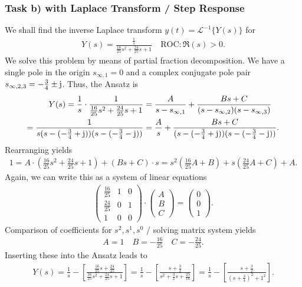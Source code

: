 \documentclass[11pt,a4paper,DIV=12]{scrartcl}
\begin{document}
\subsubsection{Task b) with Laplace Transform / Step Response}
We shall find the inverse Laplace transform $y(t) = \mathcal{L}^{-1}\{Y(s)\}$
for
\begin{align}
Y(s) = \frac{\frac{1}{s}}{\frac{16}{25} s^2 + \frac{24}{25} s + 1}
\quad \text{ROC}: \Re(s) > 0.
\end{align}
%
We solve this problem by means of partial fraction decomposition.
We have a single pole in the origin $s_{\infty,1}=0$ and a complex conjugate
pole pair $s_{\infty,2,3}=-\frac{3}{4}\pm \im$.
Thus, the Ansatz is
\begin{align}
Y(s) = \frac{1}{s}
\cdot \frac{1}{\frac{16}{25} s^2 + \frac{24}{25} s + 1} &=
\frac{A}{s-s_{\infty,1}} + \frac{Bs+C}{(s-s_{\infty,2})(s-s_{\infty,3})} \\ \nonumber
=\frac{1}{s(s-(-\frac{3}{4}+\im))(s-(-\frac{3}{4}-\im))}&=\frac{A}{s}+\frac{Bs+C}{(s-(-\frac{3}{4}+\im))(s-(-\frac{3}{4}-\im))}
.
\end{align}
Rearranging yields
\begin{align}
1 =
A \cdot (\frac{16}{25} s^2 + \frac{24}{25} s + 1) +
(B s + C) \cdot s=s^2(\frac{16}{25}A+B)+s(\frac{24}{25}A+C)+A.
\end{align}
Again, we can write this as a system of linear equations
\begin{align}
	\begin{pmatrix}
		\frac{16}{25} & 1 & 0 \\
		\frac{24}{25} & 0 & 1 \\
		1 & 0 & 0
	\end{pmatrix}
	\cdot
	\begin{pmatrix}
		A \\
		B \\
		C
	\end{pmatrix}
	=
	\begin{pmatrix}
		0 \\
		0 \\
		1
	\end{pmatrix}.
\end{align}
Comparison of coefficients for $s^2, s^1, s^0$ / solving matrix system yields
\begin{align}
  A = 1\quad B = -\frac{16}{25} \quad C = -\frac{24}{25}.
\end{align}
Inserting these into the Ansatz leads to
\begin{align}
Y(s) =
\frac{1}{s} - \left[\frac{\frac{16}{25} s + \frac{24}{25}}{\frac{16}{25} s^2 + \frac{24}{25} s + 1}\right]=
\frac{1}{s} - \left[\frac{s + \frac{3}{2}}{s^2 + \frac{3}{2} s + \frac{25}{16}}\right]=
\frac{1}{s} - \left[\frac{s + \frac{3}{2}}{(s + \frac{3}{4})^2 + 1^2}\right].
\end{align}
\end{document}
